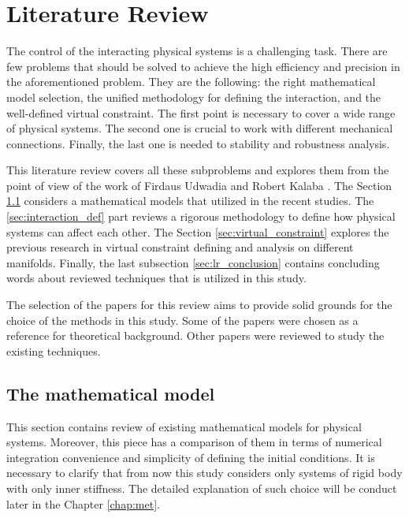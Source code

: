 \chapter{Literature Review}
\label{chap:lr}

The control of the interacting physical systems is a challenging 
task. There are few problems that should be solved to achieve the 
high efficiency and precision in the aforementioned problem. They 
are the following: the right mathematical model selection, the 
unified methodology for defining the interaction, and the well-defined 
virtual constraint. The first point is necessary to cover a wide range 
of physical systems. The second one is crucial to work with 
different mechanical connections. Finally, the last one is needed 
to stability and robustness analysis. 

This literature review covers all these subproblems and explores them
from the point of view of the work of Firdaus Udwadia and Robert Kalaba 
\cite{UdwadiaKalabaApproach}. The Section \ref{sec:math_model} considers 
a mathematical models that utilized in the recent studies. The 
\ref{sec:interaction_def} part reviews a rigorous methodology to define 
how physical systems can affect each other. The Section \ref{sec:virtual_constraint} 
explores the previous research in virtual constraint defining and analysis 
on different manifolds. Finally, the last subsection \ref{sec:lr_conclusion} 
contains concluding words about reviewed techniques that is utilized in this 
study.

The selection of the papers for this review aims to provide solid grounds for 
the choice of the methods in this study. Some of the papers were chosen as a 
reference for theoretical background. Other papers were reviewed to study the 
existing techniques.

\section{The mathematical model} \label{sec:math_model}

This section contains review of existing mathematical models for physical 
systems. Moreover, this piece has a comparison of them in terms of numerical 
integration convenience and simplicity of defining the initial conditions. 
It is necessary to clarify that from now this study considers only systems 
of rigid body with only inner stiffness. The detailed explanation of 
such choice will be conduct later in the Chapter \ref{chap:met}.

